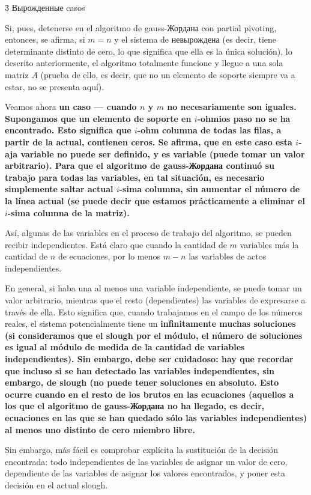 \h3{ Вырожденные casos }

Si, pues, detenerse en el algoritmo de gauss-Жордана con partial pivoting, entonces, se afirma, si $m=n$ y el sistema de невырождена (es decir, tiene determinante distinto de cero, lo que significa que ella es la única solución), lo descrito anteriormente, el algoritmo totalmente funcione y llegue a una sola matriz $A$ (prueba de ello, es decir, que no un elemento de soporte siempre va a estar, no se presenta aquí).

Veamos ahora \bf{un caso} --- cuando $n$ y $m$ no necesariamente son iguales. Supongamos que un elemento de soporte en $i$-ohmios paso no se ha encontrado. Esto significa que $i$-ohm columna de todas las filas, a partir de la actual, contienen ceros. Se afirma, que en este caso esta $i$-aja variable no puede ser definido, y es \bf{variable} (puede tomar un valor arbitrario). Para que el algoritmo de gauss-Жордана continuó su trabajo para todas las variables, en tal situación, es necesario simplemente saltar actual $i$-sima columna, sin aumentar el número de la línea actual (se puede decir que estamos prácticamente a eliminar el $i$-sima columna de la matriz).

Así, algunas de las variables en el proceso de trabajo del algoritmo, se pueden recibir independientes. Está claro que cuando la cantidad de $m$ variables más la cantidad de $n$ de ecuaciones, por lo menos $m-n$ las variables de actos independientes.

En general, si haba una al menos una variable independiente, se puede tomar un valor arbitrario, mientras que el resto (dependientes) las variables de expresarse a través de ella. Esto significa que, cuando trabajamos en el campo de los números reales, el sistema potencialmente tiene un \bf{infinitamente muchas soluciones} (si consideramos que el slough por el módulo, el número de soluciones es igual al módulo de medida de la cantidad de variables independientes). Sin embargo, debe ser cuidadoso: hay que recordar que incluso si se han detectado las variables independientes, sin embargo, de slough (\bf{no puede tener soluciones en absoluto}. Esto ocurre cuando en el resto de los brutos en las ecuaciones (aquellos a los que el algoritmo de gauss-Жордана no ha llegado, es decir, ecuaciones en las que se han quedado sólo las variables independientes) al menos uno distinto de cero miembro libre.

Sin embargo, más fácil es comprobar explícita la sustitución de la decisión encontrada: todo independientes de las variables de asignar un valor de cero, dependiente de las variables de asignar los valores encontrados, y poner esta decisión en el actual slough.



